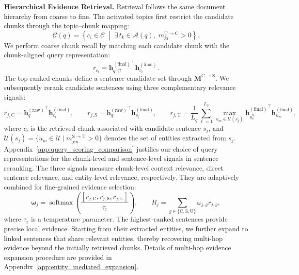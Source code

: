 \documentclass{article} %
\begin{document}
\smallskip
\noindent\textbf{Hierarchical Evidence Retrieval.}
Retrieval follows the same document hierarchy from coarse to fine. The activated topics first restrict the candidate chunks through the topic--chunk mapping:
\begin{equation}
\mathcal{C}(q)
=
\left\{
c_i \in \mathcal{C}
\;\middle|\;
\exists\, t_k \in \mathcal{A}(q),
\; m_{ki}^{\mathrm{T}\to\mathrm{C}} > 0
\right\}.
\end{equation}
We perform coarse chunk recall by matching each candidate chunk with the chunk-aligned query representation:
\begin{equation}
r_{c_i}
=
{\mathbf{h}_{q,\mathrm{C}}^{(\mathrm{final})}}^{\top}
\mathbf{h}_{c_i}^{(\mathrm{final})}.
\label{eq:chunk_retrieval_score}
\end{equation}
The top-ranked chunks define a sentence candidate set through $\mathbf{M}^{\mathrm{C}\to\mathrm{S}}$. We subsequently rerank candidate sentences using three complementary relevance signals:
\begin{equation}
r_{j,\mathrm{C}}
=
{\mathbf{h}_{q}^{(\mathrm{raw})}}^{\top}
\mathbf{h}_{c_i}^{(\mathrm{final})},
\qquad
r_{j,\mathrm{S}}
=
{\mathbf{h}_{q}^{(\mathrm{raw})}}^{\top}
\mathbf{h}_{s_j}^{(\mathrm{final})},
\qquad
r_{j,\mathrm{U}}
=
\frac{1}{L_q}
\sum_{\ell=1}^{L_q}
\max_{u_m\in\mathcal{U}(s_j)}
{\mathbf{h}_{u_{\ell}^{q}}^{(\mathrm{final})}}^{\top}
\mathbf{h}_{u_m}^{(\mathrm{final})},
\label{eq:sentence_relevance_signals}
\end{equation}
where $c_i$ is the retrieved chunk associated with candidate sentence $s_j$, and $\mathcal{U}(s_j)=\{u_m\in\mathcal{U}\mid m_{jm}^{\mathrm{S}\to\mathrm{U}}>0\}$ denotes the set of entities extracted from $s_j$. Appendix~\ref{app:query_scoring_comparison} justifies our choice of query
representations for the chunk-level and sentence-level signals in sentence reranking. The three signals measure chunk-level context relevance, direct sentence relevance, and entity-level relevance, respectively. They are adaptively combined for fine-grained evidence selection:
\begin{equation}
\boldsymbol{\omega}_{j}
=
\operatorname{softmax}\!\left(
\frac{
[r_{j,\mathrm{C}},r_{j,\mathrm{S}},r_{j,\mathrm{U}}]
}{
\tau_{\mathrm r}
}
\right),
\qquad
R_j
=
\sum_{g\in\{\mathrm{C},\mathrm{S},\mathrm{U}\}}
\omega_{j,g}r_{j,g},
\label{eq:sentence_reranking_score}
\end{equation}
where $\tau_{\mathrm r}$ is a temperature parameter. The highest-ranked sentences provide precise local evidence. Starting from their extracted entities, we further expand to linked sentences that share relevant entities, thereby recovering multi-hop evidence beyond the initially retrieved chunks. Details of multi-hop evidence expansion procedure are provided in Appendix~\ref{app:entity_mediated_expansion}.
\end{document}
